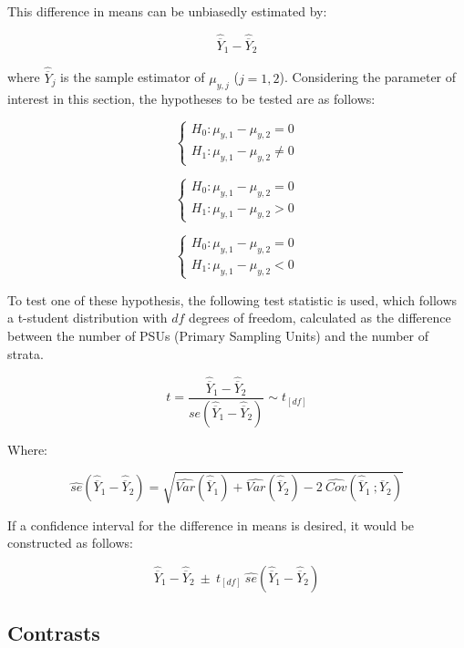 \documentclass[
  12pt,
]{book}
\begin{document}
This difference in means can be unbiasedly estimated by:

\[
\widehat{\overline{Y}}_{1} - \widehat{\overline{Y}}_{2}
\]

where \(\widehat{\overline{Y}}_{j}\) is the sample estimator of \(\mu_{y,j}\) (\(j = 1, 2\)). Considering the parameter of interest in this section, the hypotheses to be tested are as follows:

\[
\begin{cases}
H_0: \mu_{y,1} - \mu_{y,2} = 0 \\
H_1: \mu_{y,1} - \mu_{y,2} \neq 0
\end{cases} 
\]

\[
\begin{cases}
H_0: \mu_{y,1} - \mu_{y,2} = 0 \\
H_1: \mu_{y,1} - \mu_{y,2} > 0
\end{cases}
\]

\[
\begin{cases}
H_0: \mu_{y,1} - \mu_{y,2} = 0 \\
H_1: \mu_{y,1} - \mu_{y,2} < 0
\end{cases}
\]

To test one of these hypothesis, the following test statistic is used, which follows a t-student distribution with \(df\) degrees of freedom, calculated as the difference between the number of PSUs (Primary Sampling Units) and the number of strata.

\[
t = \frac{\widehat{\overline{Y}}_{1} - \widehat{\overline{Y}}_{2}} {se\left(\widehat{\overline{Y}}_{1} - \widehat{\overline{Y}}_{2}\right)} \sim t_{[df]}
\]

Where:

\[
\widehat{se} \left( \widehat{\overline{Y}}_{1} - \widehat{\overline{Y}}_{2} \right) = \sqrt{\widehat{Var}\left(\widehat{\overline{Y}}_{1}\right) + \widehat{Var}\left(\widehat{\overline{Y}}_{2}\right) - 2 \  \widehat{Cov}\left(\widehat{\overline{Y}}_{1} \ ; \widehat{\overline{Y}}_{2} \right)}
\]

If a confidence interval for the difference in means is desired, it would be constructed as follows:

\[
\widehat{\overline{Y}}_{1} - \widehat{\overline{Y}}_{2} \ \pm \ t_{[df]} \ \widehat{se}\left( \widehat{\overline{Y}}_{1} - \widehat{\overline{Y}}_{2} \right)
\]

\hypertarget{contrasts}{%
\subsection{Contrasts}\label{contrasts}}
\end{document}
